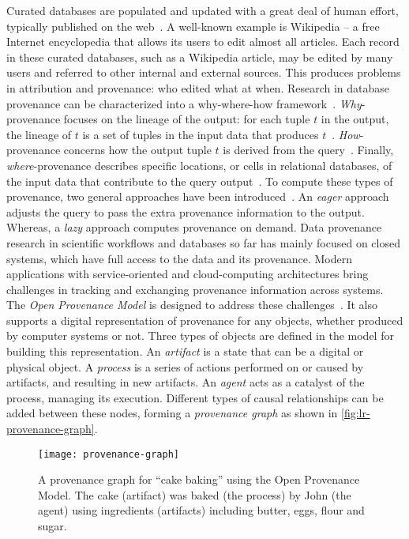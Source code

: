 Curated databases are populated and updated with a great deal of human effort, typically published on the web~\cite{Buneman2008}. A well-known example is Wikipedia -- a free Internet encyclopedia that allows its users to edit almost all articles. Each record in these curated databases, such as a Wikipedia article, may be edited by many users and referred to other internal and external sources. This produces problems in attribution and provenance: who edited what at when. Research in database provenance can be characterized into a why-where-how framework~\cite{Cheney2007}. \emph{Why}-provenance focuses on the lineage of the output: for each tuple $t$ in the output, the lineage of $t$ is a set of tuples in the input data that produces $t$~\cite{Cui2000}. \emph{How}-provenance concerns how the output tuple $t$ is derived from the query~\cite{Green2007}. Finally, \emph{where}-provenance describes specific locations, or cells in relational databases, of the input data that contribute to the query output~\cite{Buneman2001}. To compute these types of provenance, two general approaches have been introduced~\cite{Buneman2008}. An \emph{eager} approach adjusts the query to pass the extra provenance information to the output. Whereas, a \emph{lazy} approach computes provenance on demand.
Data provenance research in scientific workflows and databases so far has mainly focused on closed systems, which have full access to the data and its provenance. Modern applications with service-oriented and cloud-computing architectures bring challenges in tracking and exchanging provenance information across systems. The \emph{Open Provenance Model} is designed to address these challenges~\cite{Moreau2011}. It also supports a digital representation of provenance for any objects, whether produced by computer systems or not. Three types of objects are defined in the model for building this representation. An \emph{artifact} is a state that can be a digital or physical object. A \emph{process} is a series of actions performed on or caused by artifacts, and resulting in new artifacts. An \emph{agent} acts as a catalyst of the process, managing its execution. Different types of causal relationships can be added between these nodes, forming a \emph{provenance graph} as shown in \autoref{fig:lr-provenance-graph}.

\begin{figure}[!htb]
	\centering	\texttt{[image: provenance-graph]}
	\caption{A provenance graph for ``cake baking'' using the Open Provenance Model. The cake (artifact) was baked (the process) by John (the agent) using ingredients (artifacts) including butter, eggs, flour and sugar. }
	\label{fig:lr-provenance-graph}
\end{figure}

